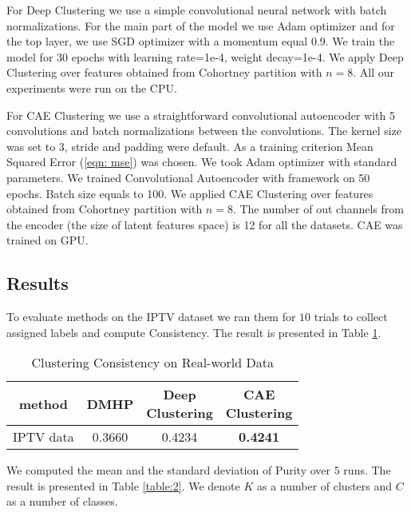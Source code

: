 \documentclass[10pt]{article}
\begin{document}
For Deep Clustering we use a simple convolutional neural network with batch normalizations. For the main part of the model we use Adam optimizer and for the top layer, we use SGD optimizer with a momentum equal $0.9$. We train the model for $30$ epochs with  learning rate=1e-4, weight decay=1e-4. We apply Deep Clustering over features obtained from Cohortney partition with $n=8$. All our experiments were run on the CPU.

For CAE Clustering we use a straightforward convolutional autoencoder with 5 convolutions and batch normalizations between the convolutions.  The kernel size was set to $3$, stride and padding were default. As a training criterion Mean Squared Error (\ref{eqn: mse}) was chosen. We took Adam optimizer with standard parameters. We trained Convolutional Autoencoder with  framework on 50 epochs. Batch size equals to 100. We applied CAE Clustering over features obtained from Cohortney partition with $n=8$. The number of out channels from the encoder (the size of latent features space) is 12 for all the datasets. CAE was trained on GPU.


\subsection{Results}


To evaluate methods on the IPTV dataset we ran them for $10$ trials to collect assigned labels and compute Consistency. The result is presented in Table \ref{table:1}.

\begin{table}[h!]
\caption{Clustering Consistency on Real-world Data}
\begin{tabular}{c|ccc}
\hline
method    & \textbf{DMHP}   & \makecell{\textbf{Deep} \\\textbf{Clustering}}   & \makecell{\textbf{CAE} \\\textbf{Clustering}}  \\ \hline
IPTV data & 0.3660 & 0.4234 &\textbf{ 0.4241}
\end{tabular}
\label{table:1}
\end{table}

We computed the mean and the standard deviation of Purity over $5$ runs. The result is presented in Table \ref{table:2}. We denote $K$ as a number of clusters and $C$ as a number of classes. 
\end{document}
